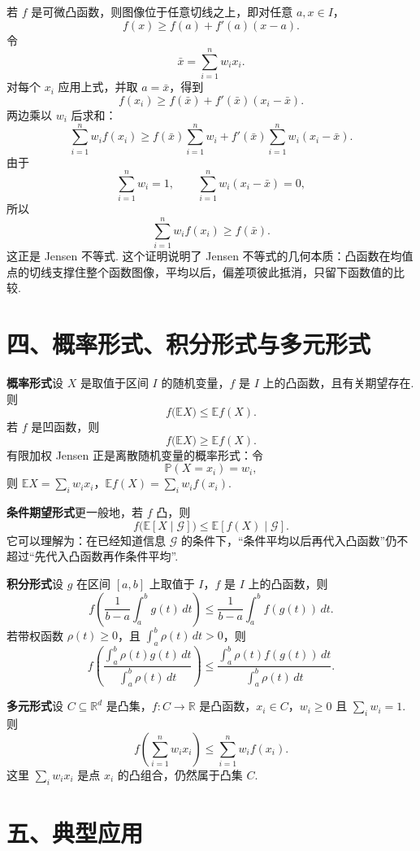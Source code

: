 \documentclass[UTF8, 12pt, fontset=fandol, oneside]{ctexart}
\begin{document}
若 $f$ 是可微凸函数，则图像位于任意切线之上，即对任意 $a,x\in I$，
\[
  f(x)\ge f(a)+f'(a)(x-a).
\]
令
\[
  \bar x=\sum_{i=1}^n w_i x_i.
\]
对每个 $x_i$ 应用上式，并取 $a=\bar x$，得到
\[
  f(x_i)\ge f(\bar x)+f'(\bar x)(x_i-\bar x).
\]
两边乘以 $w_i$ 后求和：
\[
  \sum_{i=1}^n w_if(x_i)
  \ge
  f(\bar x)\sum_{i=1}^n w_i
  +f'(\bar x)\sum_{i=1}^n w_i(x_i-\bar x).
\]
由于
\[
  \sum_{i=1}^n w_i=1,\qquad
  \sum_{i=1}^n w_i(x_i-\bar x)=0,
\]
所以
\[
  \sum_{i=1}^n w_if(x_i)\ge f(\bar x).
\]
这正是 Jensen 不等式. 这个证明说明了 Jensen 不等式的几何本质：凸函数在均值点的切线支撑住整个函数图像，平均以后，偏差项彼此抵消，只留下函数值的比较.

\section*{四、概率形式、积分形式与多元形式}

\noindent\textbf{概率形式}\quad 设 $X$ 是取值于区间 $I$ 的随机变量，$f$ 是 $I$ 上的凸函数，且有关期望存在. 则
\[
  f\bigl(\mathbb E X\bigr)\le \mathbb E f(X).
\]
若 $f$ 是凹函数，则
\[
  f\bigl(\mathbb E X\bigr)\ge \mathbb E f(X).
\]
有限加权 Jensen 正是离散随机变量的概率形式：令
\[
  \mathbb P(X=x_i)=w_i,
\]
则 $\mathbb E X=\sum_iw_ix_i$，$\mathbb Ef(X)=\sum_iw_if(x_i)$.

\noindent\textbf{条件期望形式}\quad 更一般地，若 $f$ 凸，则
\[
  f\bigl(\mathbb E[X\mid\mathcal G]\bigr)
  \le
  \mathbb E[f(X)\mid\mathcal G].
\]
它可以理解为：在已经知道信息 $\mathcal G$ 的条件下，``条件平均以后再代入凸函数''仍不超过``先代入凸函数再作条件平均''.

\noindent\textbf{积分形式}\quad 设 $g$ 在区间 $[a,b]$ 上取值于 $I$，$f$ 是 $I$ 上的凸函数，则
\[
  f\left(\frac{1}{b-a}\int_a^b g(t)\,dt\right)
  \le
  \frac{1}{b-a}\int_a^b f(g(t))\,dt.
\]
若带权函数 $\rho(t)\ge0$，且 $\int_a^b\rho(t)\,dt>0$，则
\[
  f\left(\frac{\int_a^b \rho(t)g(t)\,dt}{\int_a^b\rho(t)\,dt}\right)
  \le
  \frac{\int_a^b \rho(t)f(g(t))\,dt}{\int_a^b\rho(t)\,dt}.
\]

\noindent\textbf{多元形式}\quad 设 $C\subseteq\mathbb R^d$ 是凸集，$f:C\to\mathbb R$ 是凸函数，$x_i\in C$，$w_i\ge0$ 且 $\sum_iw_i=1$. 则
\[
  f\left(\sum_{i=1}^n w_ix_i\right)
  \le
  \sum_{i=1}^n w_if(x_i).
\]
这里 $\sum_iw_ix_i$ 是点 $x_i$ 的凸组合，仍然属于凸集 $C$.

\section*{五、典型应用}
\end{document}
